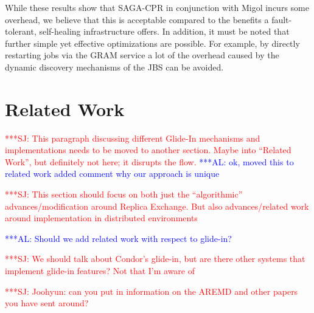 \documentclass{rspublic}
\newcommand{\alnote}[1]{ {\textcolor{blue} { ***AL: #1 }}}
\newcommand{\jhanote}[1]{ {\textcolor{red} { ***SJ: #1 }}}
\newcommand{\alnote}[1]{}
\newcommand{\jhanote}[1]{}
\begin{document}
While these results show that SAGA-CPR in conjunction with Migol
incurs some overhead, we believe that this is acceptable compared to
the benefits a fault-tolerant, self-healing infrastructure offers. In
addition, it must be noted that further simple yet effective
optimizations are possible. For example, by directly restarting jobs
via the GRAM service a lot of the overhead caused by the dynamic
discovery mechanisms of the JBS can be avoided. 



\section{Related Work}

\jhanote{This paragraph discussing different Glide-In mechanisms and
  implementations needs to be moved to another section. Maybe into
  ``Related Work'', but definitely not here; it disrupts the flow.}
\alnote{ok, moved this to related work added comment why our approach is unique}
  



\jhanote{This section should focus on both just the ``algorithmic''
  advances/modification around Replica Exchange. But also
  advances/related work around  implementation in distributed
  environments}
                       
\alnote{Should we add related work with respect to glide-in?}

\jhanote{We should talk about Condor's glide-in, but are there other
  systems that implement glide-in features? Not that I'm aware of}

\jhanote{Joohyun: can you put in information on the AREMD and other
  papers you have sent around?}


                                 
\end{document}
